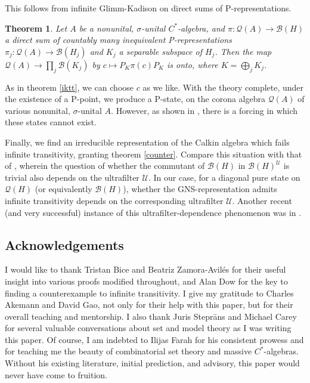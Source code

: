 \documentclass[10pt]{amsart}
\newtheorem{introthm}{Theorem}
\theoremstyle{definition}
\newcommand{\U}{\mathscr{U}}
\begin{document}
This follows from infinite Glimm-Kadison on direct sums of P-representations.

\begin{introthm}\label{igk}
    Let $A$ be a nonunital, $\sigma$-unital $C^*$-algebra, and $\pi:\mathscr{Q}(A)\rightarrow\mathscr{B}(H)$ a direct sum of countably many inequivalent P-representations $\pi_j:\mathscr{Q}(A)\rightarrow\mathscr{B}(H_j)$ and $K_j$ a separable subspace of $H_j$. Then the map $\mathscr{Q}(A)\rightarrow\prod_j\mathscr{B}(K_j)$ by $c\mapsto P_K\pi(c)P_K$ is onto, where $K=\bigoplus_jK_j$.
\end{introthm}

As in theorem \ref{iktt}, we can choose $c$ as we like. With the theory complete, under the existence of a P-point, we produce a P-state, on the corona algebra $\mathscr{Q}(A)$ of various nonunital, $\sigma$-unital $A$. However, as shown in \cite{BI13}, there is a forcing in which these states cannot exist.

Finally, we find an irreducible representation of the Calkin algebra which fails infinite transitivity, granting theorem \ref{counter}. Compare this situation with that of \cite{FA10}, wherein the question of whether the commutant of $\mathscr{B}(H)$ in $\mathscr{B}(H)^\U$ is trivial also depends on the ultrafilter $\U$. In our case, for a diagonal pure state on $\mathscr{Q}(H)$ (or equivalently $\mathscr{B}(H)$), whether the GNS-representation admits infinite transitivity depends on the corresponding ultrafilter $\U$. Another recent (and very successful) instance of this ultrafilter-dependence phenomenon was in \cite{ZA25}.

\subsection{Acknowledgements}

I would like to thank Tristan Bice and Beatriz Zamora-Avilés for their useful insight into various proofs modified throughout, and Alan Dow for the key to finding a counterexample to infinite transitivity. I give my gratitude to Charles Akemann and David Gao, not only for their help with this paper, but for their overall teaching and mentorship. I also thank Juris Steprāns and Michael Carey for several valuable conversations about set and model theory as I was writing this paper. Of course, I am indebted to Ilijas Farah for his consistent prowess and for teaching me the beauty of combinatorial set theory and massive $C^*$-algebras. Without his existing literature, initial prediction, and advisory, this paper would never have come to fruition.
\end{document}
